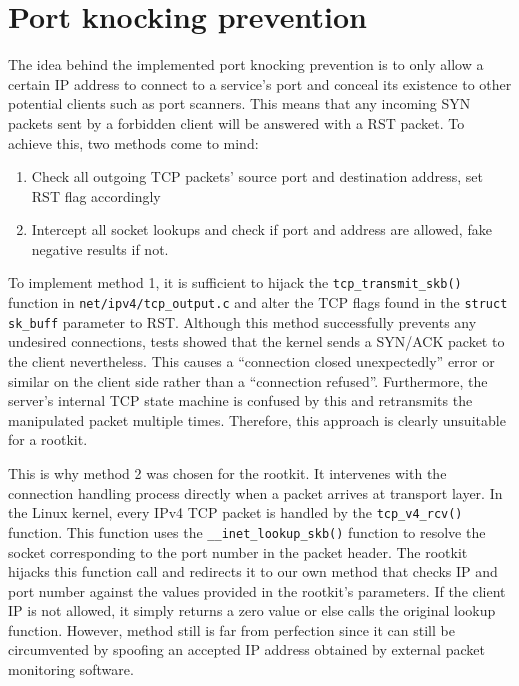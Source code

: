 \section{Port knocking prevention}
The idea behind the implemented port knocking prevention is to only allow a certain
IP address to connect to a service's port and conceal its existence to other potential clients such as port scanners. 
This means that any incoming SYN packets sent by a forbidden client will be answered with a RST packet. To achieve this,
two methods come to mind:
\begin{enumerate}
 \item Check all outgoing TCP packets' source port and destination address, set RST flag accordingly
 \item Intercept all socket lookups and check if port and address are allowed, fake negative results if not.
\end{enumerate}
To implement method 1, it is sufficient to hijack the 
\verb+tcp_transmit_skb()+ function in \verb+net/ipv4/tcp_output.c+ and alter the TCP flags found in the \verb+struct sk_buff+
parameter to RST. Although this method successfully prevents any undesired connections, tests showed that the kernel sends a SYN/ACK
packet to the client nevertheless. This causes a ``connection closed unexpectedly'' error or similar on the client side rather than a
``connection refused''. Furthermore, the server's internal TCP state machine is confused by this and retransmits the manipulated packet
multiple times. Therefore, this approach is clearly unsuitable for a rootkit. \par
This is why method 2 was chosen for the rootkit. It intervenes with the 
connection handling process directly when a packet arrives at transport layer.
In the Linux kernel, every IPv4 TCP packet is handled by the \texttt{tcp\_v4\_rcv()} function. This 
function uses the \texttt{\_\_inet\_lookup\_skb()} function to resolve the socket 
corresponding to the port number in the packet header. The rootkit hijacks this function call and
redirects it to our own method that checks IP and port number against the values provided in the rootkit's parameters. If the client IP
is not allowed, it simply returns a zero value or else calls the original lookup 
function.
However, method still is far from perfection since it can still be circumvented by spoofing an accepted IP address obtained by external packet monitoring software.

